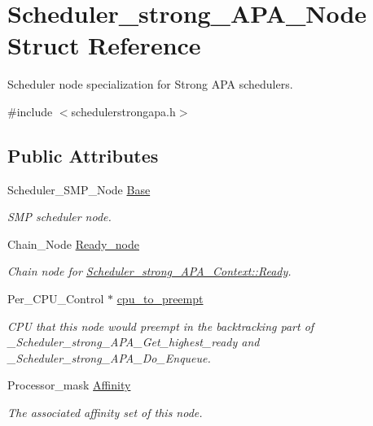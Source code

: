 \hypertarget{structScheduler__strong__APA__Node}{}\section{Scheduler\+\_\+strong\+\_\+\+A\+P\+A\+\_\+\+Node Struct Reference}
\label{structScheduler__strong__APA__Node}


Scheduler node specialization for Strong A\+PA schedulers.  




{\ttfamily \#include $<$schedulerstrongapa.\+h$>$}

\subsection*{Public Attributes}
\begin{DoxyCompactItemize}
\item 
Scheduler\+\_\+\+S\+M\+P\+\_\+\+Node \hyperlink{structScheduler__strong__APA__Node_ae86cbf5fd8743267abe33bed6d8b0fe6}{Base}
\begin{DoxyCompactList}\small\item\em S\+MP scheduler node. \end{DoxyCompactList}\item 
Chain\+\_\+\+Node \hyperlink{structScheduler__strong__APA__Node_a275ee9d3d456dcfd308e2eab306bf581}{Ready\+\_\+node}
\begin{DoxyCompactList}\small\item\em Chain node for \hyperlink{structScheduler__strong__APA__Context_a0c445c35a07b8aa14f9d76c6dfb4916c}{Scheduler\+\_\+strong\+\_\+\+A\+P\+A\+\_\+\+Context\+::\+Ready}. \end{DoxyCompactList}\item 
Per\+\_\+\+C\+P\+U\+\_\+\+Control $\ast$ \hyperlink{structScheduler__strong__APA__Node_af88ba145a84fd95d104f2bb48e462ed2}{cpu\+\_\+to\+\_\+preempt}
\begin{DoxyCompactList}\small\item\em C\+PU that this node would preempt in the backtracking part of \+\_\+\+Scheduler\+\_\+strong\+\_\+\+A\+P\+A\+\_\+\+Get\+\_\+highest\+\_\+ready and \+\_\+\+Scheduler\+\_\+strong\+\_\+\+A\+P\+A\+\_\+\+Do\+\_\+\+Enqueue. \end{DoxyCompactList}\item 
Processor\+\_\+mask \hyperlink{structScheduler__strong__APA__Node_a7672e477658785808b0069f11bc4d24e}{Affinity}
\begin{DoxyCompactList}\small\item\em The associated affinity set of this node. \end{DoxyCompactList}\end{DoxyCompactItemize}


